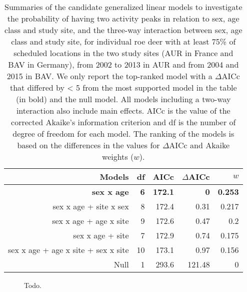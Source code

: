 \documentclass[a4paper,11pt]{article}
\begin{document}
\begin{table}[htbp]
  \centering
  \caption{Summaries of the candidate generalized linear models to
    investigate the probability of having two activity peaks in
    relation to sex, age class and study site, and the three-way
    interaction between sex, age class and study site, for individual
    roe deer with at least 75\% of scheduled locations in the two
    study sites (AUR in France and BAV in Germany), from 2002 to 2013
    in AUR and from 2004 and 2015 in BAV. We only report the
    top-ranked model with a $\Delta$AICc that differed by < 5 from the most
    supported model in the table (in bold) and the null model. All
    models including a two-way interaction also include main
    effects. AICc is the value of the corrected Akaike’s information
    criterion and df is the number of degree of freedom for each
    model. The ranking of the models is based on the differences in
    the values for $\Delta$AICc and Akaike weights ($w$).}
  
    \begin{tabular}{rrrrr}
    \\
    \hline
        Models & df    & AICc  & $\Delta$AICc & $w$ \\
    \hline
    \textbf{sex x age} & \textbf{6}     & \textbf{172.1} & \textbf{0}     & \textbf{0.253} \\
    sex x age  + site x sex & 8     & 172.4 & 0.31  & 0.217 \\
    sex x age + age x site & 9     & 172.6 & 0.47  & 0.2 \\
    sex x age + site & 7     & 172.9 & 0.74  & 0.175 \\
    sex x age + age x site + sex x site & 10    & 173.1 & 0.97  & 0.156 \\
    Null  & 1     & 293.6 & 121.48 & 0 \\
    \hline
    \end{tabular}
  \label{tab:addlabel}
\end{table}

\newpage

\begin{figure} [!h]
\centering
\caption{Todo.}
\end{figure}
\end{document}
